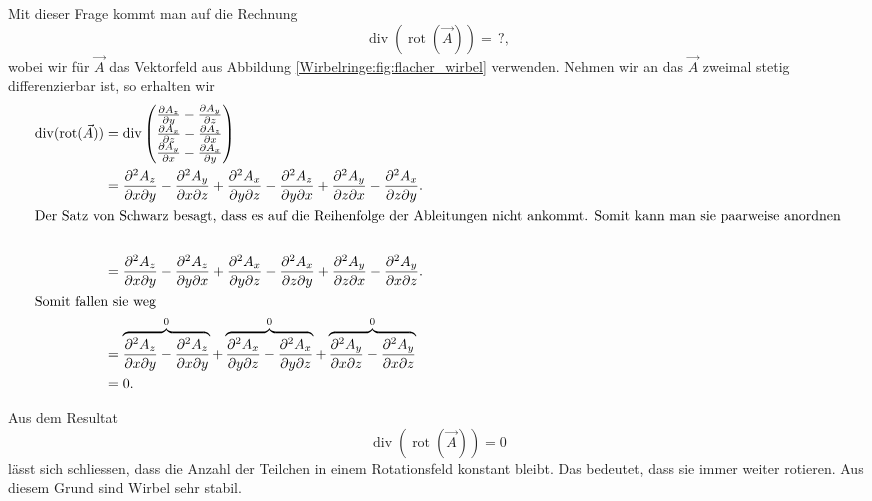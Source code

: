 Mit dieser Frage kommt man auf die Rechnung
\[
\operatorname{div} ( \operatorname{rot} ( \vec{A} ) )
= %
\,?,
\]
wobei wir für \(\vec{A}\) das Vektorfeld aus Abbildung \ref{Wirbelringe:fig:flacher_wirbel} verwenden.
Nehmen wir an das \(\vec{A}\) zweimal stetig differenzierbar ist, so erhalten wir
\begin{align*}
\operatorname{div} ( \operatorname{rot} ( \vec{A} ) )
&=
\operatorname{div}      
    \begin{pmatrix} 
        \frac{\partial A_z}{\partial y} - \frac{\partial A_y}{\partial z} \\ 
        \frac{\partial A_x}{\partial z} - \frac{\partial A_z}{\partial x} \\ 
        \frac{\partial A_y}{\partial x} - \frac{\partial A_x}{\partial y} \\ 
    \end{pmatrix} \\
&=
\frac{\partial^2 A_z}{\partial x \partial y} - \frac{\partial^2 A_y}{\partial x \partial z} + 
\frac{\partial^2 A_x}{\partial y \partial z} - \frac{\partial^2 A_z}{\partial y \partial x} +
\frac{\partial^2 A_y}{\partial z \partial x} - \frac{\partial^2 A_x}{\partial z \partial y}
.\\
\intertext{Der Satz von Schwarz besagt, dass es auf die Reihenfolge der Ableitungen nicht ankommt. Somit kann man sie paarweise anordnen}\\
&=
\frac{\partial^2 A_z}{\partial x \partial y} - \frac{\partial^2 A_z}{\partial y \partial x} + 
\frac{\partial^2 A_x}{\partial y \partial z} - \frac{\partial^2 A_x}{\partial z \partial y} +
\frac{\partial^2 A_y}{\partial z \partial x} - \frac{\partial^2 A_y}{\partial x \partial z}.
\\
\intertext{Somit fallen sie weg}
&=
\overbrace{\frac{\partial^2 A_z}{\partial x \partial y} - \frac{\partial^2 A_z}{\partial x \partial y}}^0 + 
\overbrace{\frac{\partial^2 A_x}{\partial y \partial z} - \frac{\partial^2 A_x}{\partial y \partial z}}^0 +
\overbrace{\frac{\partial^2 A_y}{\partial x \partial z} - \frac{\partial^2 A_y}{\partial x \partial z}}^0
\\
&=
0.
\end{align*}

Aus dem Resultat
\begin{equation}
    \label{Wirbelringe:eq:wIdent}
\operatorname{div} ( \operatorname{rot} ( \vec{A} ) ) 
= 
0
\end{equation}
lässt sich schliessen, dass die Anzahl der Teilchen in einem Rotationsfeld konstant bleibt. 
Das bedeutet, dass sie immer weiter rotieren. 
Aus diesem Grund sind Wirbel sehr stabil.

